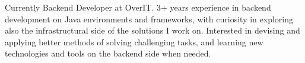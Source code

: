 

\begin{cvparagraph}
	
	Currently Backend Developer at OverIT. 3+ years experience in backend development on Java environments and frameworks, with curiosity in exploring also the infrastructural side of the solutions I work on. Interested in devising and applying better methods of solving challenging tasks, and learning new technologies and tools on the backend side when needed.
\end{cvparagraph}